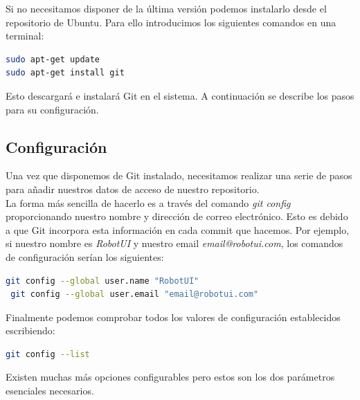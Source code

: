 \begin{appendix}
Si no necesitamos disponer de la última versión podemos instalarlo desde el repositorio de Ubuntu. Para ello introducimos los siguientes comandos en una terminal:\\

\begin{lstlisting}[language=bash]
sudo apt-get update
sudo apt-get install git
\end{lstlisting}

Esto descargará e instalará Git en el sistema. A continuación se describe los pasos para su configuración.

\subsection{Configuración}

Una vez que disponemos de Git instalado, necesitamos realizar una serie de pasos para añadir nuestros datos de acceso de nuestro repositorio.\\

La forma más sencilla de hacerlo es a través del comando \emph{git config} proporcionando nuestro nombre y dirección de correo electrónico. Esto es debido a que Git incorpora esta información en cada commit
que hacemos. Por ejemplo, si nuestro nombre es \emph{RobotUI} y nuestro email \emph{email@robotui.com}, los comandos de configuración serían los siguientes:\\

\begin{lstlisting}[language=bash]
 git config --global user.name "RobotUI"
 git config --global user.email "email@robotui.com"
\end{lstlisting}

Finalmente podemos comprobar todos los valores de configuración establecidos escribiendo:\\

\begin{lstlisting}[language=bash]
git config --list
\end{lstlisting}

Existen muchas más opciones configurables pero estos son los dos parámetros esenciales necesarios.\\

\end{appendix}





